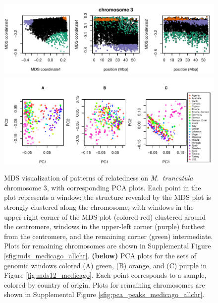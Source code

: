 \documentclass[11pt, oneside]{article}   	%
\begin{document}
\begin{figure}
    \begin{center}
       \includegraphics{Fig6_Together_MDS_plot_chr3_final}
       \includegraphics{Fig7_pca_plots_for_Medicago_chr3_3peaks_byMDS}
    \end{center}
    \caption{
       MDS visualization of patterns of relatedness on \textit{M.~truncatula} chromosome 3,
       with corresponding PCA plots.
       Each point in the plot represents a window;
       the structure revealed by the MDS plot is strongly clustered along the chromosome,
       with windows in the upper-right corner of the MDS plot (colored red) clustered around the centromere,
       windows in the upper-left corner (purple) furthest from the centromere,
       and the remaining corner (green) intermediate.
       Plots for remaining chromosomes are shown in Supplemental Figure \ref{sfig:mds_medicago_allchr}.
       \textbf{(below)}
        PCA plots for the sets of genomic windows colored (A) green, (B) orange, and (C) purple in Figure \ref{fig:mds12_medicago}. 
        Each point corresponds to a sample, colored by country of origin.
        Plots for remaining chromosomes are shown in Supplemental Figure \ref{sfig:pca_peaks_medicago_allchr}.
       \label{fig:mds12_medicago}
       \label{fig:pca_medicago}
    }
\end{figure}
\end{document}
